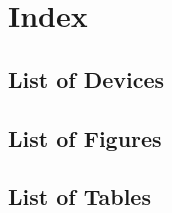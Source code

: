 \section{Index}

\subsection{List of Devices}

\subsection{List of Figures}
\listoffigures

\subsection{List of Tables}
\listoftables               %